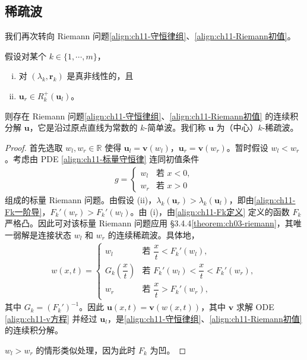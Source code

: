 \documentclass[../../main.tex]{subfiles}
\begin{document}
\subsection{稀疏波}\label{subsection:ch11-稀疏波}

我们再次转向 Riemann 问题\eqref{align:ch11-守恒律组}、\eqref{align:ch11-Riemann初值}。

\begin{theorem}[$k$-稀疏波的存在性。]\label{theorem:ch11-k稀疏波存在性}假设对某个 $k\in\{1,\cdots,m\}$，
\begin{enumerate}[(i)]
\item 对 $(\lambda_k,\mathbf{r}_k)$ 是真非线性的，且
\item $\mathbf{u}_r\in R_k^+(\mathbf{u}_l)$。
\end{enumerate}
则存在 Riemann 问题\eqref{align:ch11-守恒律组}、\eqref{align:ch11-Riemann初值} 的连续积分解 $\mathbf{u}$，它是沿过原点直线为常数的 $k$-简单波。我们称 $\mathbf{u}$ 为（中心）$k$-稀疏波。
\end{theorem}

\begin{proof}
首先选取 $w_l,w_r\in\mathbb{R}$ 使得 $\mathbf{u}_l=\mathbf{v}(w_l)$，$\mathbf{u}_r=\mathbf{v}(w_r)$。暂时假设 $w_l<w_r$。考虑由 PDE \eqref{align:ch11-标量守恒律} 连同初值条件
\begin{align*}
g=\begin{cases}
w_l & \text{若 } x<0,\\
w_r & \text{若 } x>0
\end{cases}
\end{align*}
组成的标量 Riemann 问题。由假设 (ii)，$\lambda_k(\mathbf{u}_r)>\lambda_k(\mathbf{u}_l)$，即由\eqref{align:ch11-Fk一阶导}，$F_k'(w_r)>F_k'(w_l)$。由 (i)，由\eqref{align:ch11-Fk定义} 定义的函数 $F_k$ 严格凸。因此可对该标量 Riemann 问题应用 \S3.4.4\cref{theorem:ch03-riemann}，其唯一弱解是连接状态 $w_l$ 和 $w_r$ 的连续稀疏波。具体地，
\begin{align*}
w(x,t)=
\begin{cases}
w_l & \text{若 } \dfrac{x}{t}<F_k'(w_l),\\
G_k\left(\dfrac{x}{t}\right) & \text{若 } F_k'(w_l)<\dfrac{x}{t}<F_k'(w_r),\\
w_r & \text{若 } \dfrac{x}{t}>F_k'(w_r),
\end{cases}
\end{align*}
其中 $G_k=(F_k')^{-1}$。因此 $\mathbf{u}(x,t)=\mathbf{v}(w(x,t))$，其中 $\mathbf{v}$ 求解 ODE \eqref{align:ch11-v方程} 并经过 $\mathbf{u}_l$，是\eqref{align:ch11-守恒律组}、\eqref{align:ch11-Riemann初值} 的连续积分解。

$w_l>w_r$ 的情形类似处理，因为此时 $F_k$ 为凹。
\end{proof}
\end{document}
